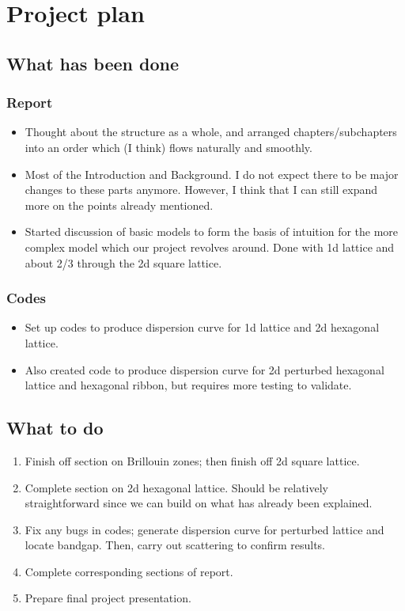 \chapter{Project plan}

\section{What has been done}

\subsection{Report}
\begin{itemize}
  \item Thought about the structure as a whole, and arranged
        chapters/subchapters into an order which (I think) flows naturally and
        smoothly.
  \item Most of the Introduction and Background. I do not expect there to be
        major changes to these parts anymore. However, I think that I can still
        expand more on the points already mentioned.
  \item Started discussion of basic models to form the basis of intuition for
        the more complex model which our project revolves around. Done with 1d
        lattice and about 2/3 through the 2d square lattice.
\end{itemize}

\subsection{Codes}
\begin{itemize}
  \item Set up codes to produce dispersion curve for 1d lattice and 2d
        hexagonal lattice.
  \item Also created code to produce dispersion curve for 2d perturbed
        hexagonal lattice and hexagonal ribbon, but requires more testing to
        validate. 
\end{itemize}

\section{What to do}
\begin{enumerate}
  \item Finish off section on Brillouin zones; then finish off 2d square
        lattice.
  \item Complete section on 2d hexagonal lattice. Should be relatively
        straightforward since we can build on what has already been explained.
  \item Fix any bugs in codes; generate dispersion curve for perturbed lattice
        and locate bandgap. Then, carry out scattering to confirm results.
  \item Complete corresponding sections of report.
  \item Prepare final project presentation.
\end{enumerate}

